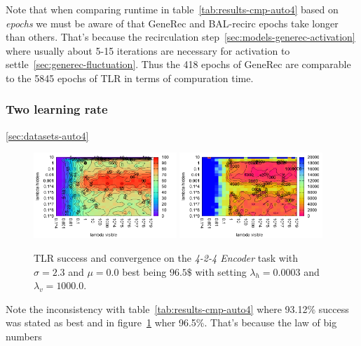 Note that when comparing runtime in table~\ref{tab:results-cmp-auto4} based on \emph{epochs} we must be aware of that GeneRec and BAL-recirc epochs take longer than others. That's because the recirculation step~\ref{sec:models-generec-activation} where usually about 5-15 iterations are necessary for activation to settle~\ref{sec:generec-fluctuation}. Thus the 418 epochs of GeneRec are comparable to the 5845 epochs of TLR in terms of compuration time. 

\subsubsection{Two learning rate} 
\label{sec:tlr-auto4} 
\ref{sec:datasets-auto4} 
\begin{figure}[H]
  \centering
  \includegraphics[width=0.48\textwidth]{img/tlr-auto4-success.pdf}   
  \includegraphics[width=0.48\textwidth]{img/tlr-auto4-epoch.pdf}     
  \caption{TLR success and convergence on the \emph{4-2-4 Encoder} task with $\sigma = 2.3$ and $\mu = 0.0$ best being $96.5\$$ with setting $\lambda_h=0.0003$ and $\lambda_v=1000.0$.}
  \label{fig:results-tlr-auto4-performance}
\end{figure}

Note the inconsistency with table~\ref{tab:results-cmp-auto4} where 93.12\% success was stated as best and in figure~\ref{fig:results-tlr-auto4-performance} wher 96.5\%. That's because the law of big numbers 

